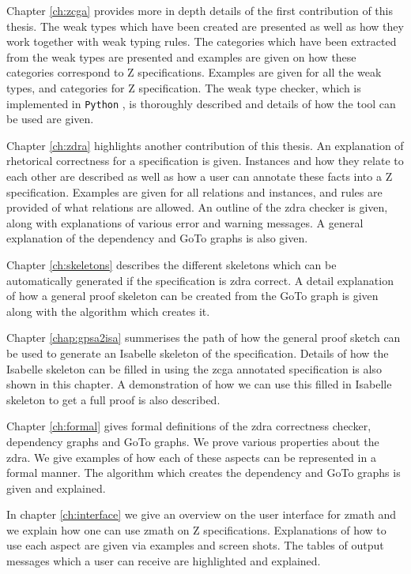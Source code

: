 Chapter \ref{ch:zcga} provides more in depth details of the first contribution of this thesis. The weak types which have been created are presented as well as how they work together with weak typing rules. The categories which have been extracted from the weak types are presented and examples are given on how these categories correspond to Z specifications. Examples are given for all the weak types, and categories for Z specification. The weak type checker, which is implemented in \texttt{Python} \cite{Python}, is thoroughly described and details of how the tool can be used are given.

Chapter \ref{ch:zdra} highlights another contribution of this thesis. An explanation of rhetorical correctness for a specification is given. Instances and how they relate to each other are described as well as how a user can annotate these facts into a Z specification. Examples are given for all relations and instances, and rules are provided of what relations are allowed. An outline of the \gls{zdra} checker is given, along with explanations of various error and warning messages. A general explanation of the dependency and GoTo graphs is also given.

Chapter \ref{ch:skeletons} describes the different skeletons which can be automatically generated if the specification is \gls{zdra} correct. A detail explanation of how a general proof skeleton can be created from the GoTo graph is given along with the algorithm which creates it. 

Chapter \ref{chap:gpsa2isa} summerises the path of how the general proof sketch can be used to generate an Isabelle skeleton of the specification. Details of how the Isabelle skeleton can be filled in using the \gls{zcga} annotated specification is also shown in this chapter. A demonstration of how we can use this filled in Isabelle skeleton to get a full proof is also described.

Chapter \ref{ch:formal} gives formal definitions of the \gls{zdra} correctness checker, dependency graphs and GoTo graphs. We prove various properties about the \gls{zdra}. We give examples of how each of these aspects can be represented in a formal manner. The algorithm which creates the dependency and GoTo graphs is given and explained.

In chapter \ref{ch:interface} we give an overview on the user interface for \gls{zmath} and we explain how one can use \gls{zmath} on Z specifications. Explanations of how to use each aspect are given via examples and screen shots. The tables of output messages which a user can receive are highlighted and explained.

